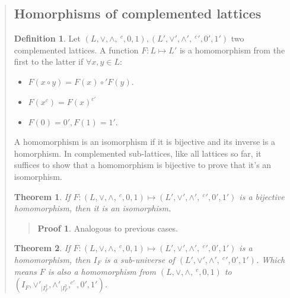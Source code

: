 \documentclass[a4paper, 12pt]{article}
\newtheorem{theorem}{Theorem}
\theoremstyle{definition}
\theoremstyle{definition}
\theoremstyle{definition}
\newtheorem{definition}{Definition}
\newtheorem{pro}{Proof}
\begin{document}
\begin{quote}
\subsection{Homorphisms of complemented lattices}

\begin{definition}
    Let $(L, \lor, \land, ~^c, 0, 1), (L', \lor', \land', ~^c', 0', 1')$ two 
    complemented lattices. A function $F: L \mapsto  L'$ is a 
    homomorphism from the first to the latter if $\forall x, y \in L$:

    \begin{itemize}
        \item $F(x \circ y) = F(x) \circ' F(y)$.
        \item $F(x^c) = F(x)^{c'}$
        \item $F(0) = 0', F(1) = 1'$.
    \end{itemize}
\end{definition}

A homomorphism is an isomorphism if it is bijective and its inverse is 
a homorphism. In complemented sub-lattices, like all lattices so far, it
suffices to show that a homomorphism is bijective to prove that it's an
isomorphism. 

\begin{theorem}
    If $F : (L, \lor, \land, ~^c, 0, 1) \mapsto (L', \lor', \land', ~^c', 0', 1')$
    is a bijective homomorphism, then it is an isomorphism.
\end{theorem}


\small
\begin{quote}

\begin{pro}
    Analogous to previous cases.
\end{pro}

\end{quote}
\normalsize

\begin{theorem}
    If $F: (L, \lor, \land, ~^c, 0, 1)\mapsto (L', \lor', \land', ~^c', 0',
    1')$ is a homomorphism, then $I_F$ is a sub-universe of $(L', \lor',
    \land', ~^c', 0', 1')$. Which means $F$ is also a homomorphism from $(L,
    \lor, \land, ~^c, 0, 1)$ to $(I_F, \lor'_{|I_F^2}, \land'_{|I_F^2}, ^{c'},
    0', 1')$.
\end{theorem}



\end{quote}
\end{document}
